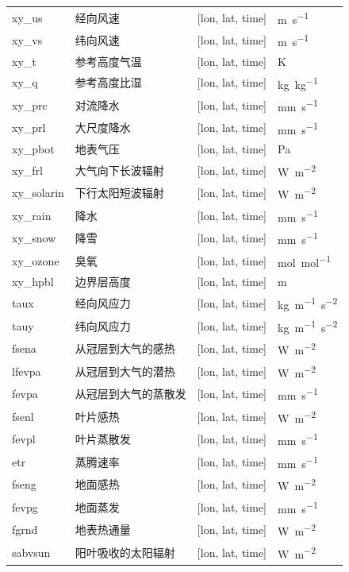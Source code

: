 \documentclass[a4paper,12pt,twoside]{article}
\begin{document}
{\begin{longtable}[htbp]{lp{}p{}l}
xy\_us & 经向风速 & {[}lon, lat, time{]} & \unit{m.s^{-1}} \\
xy\_vs & 纬向风速 & {[}lon, lat, time{]} & \unit{m.s^{-1}} \\
xy\_t & 参考高度气温 & {[}lon, lat, time{]}  & K \\
xy\_q & 参考高度比湿 & {[}lon, lat, time{]}  & \unit{kg.kg^{-1}} \\
xy\_prc & 对流降水 & {[}lon, lat, time{]}  & \unit{mm.s^{-1}} \\
xy\_prl & 大尺度降水 & {[}lon, lat, time{]}  & \unit{mm.s^{-1}} \\
xy\_pbot & 地表气压 & {[}lon, lat, time{]}  & Pa \\
xy\_frl & 大气向下长波辐射 & {[}lon, lat, time{]}  & \unit{W.m^{-2}} \\
xy\_solarin & 下行太阳短波辐射 & {[}lon, lat, time{]}  & \unit{W.m^{-2}} \\
xy\_rain & 降水 & {[}lon, lat, time{]}  & \unit{mm.s^{-1}} \\
xy\_snow & 降雪 & {[}lon, lat, time{]}  & \unit{mm.s^{-1}} \\
xy\_ozone & 臭氧 & {[}lon, lat, time{]}  & \unit{mol.mol^{-1}} \\
xy\_hpbl & 边界层高度 & {[}lon, lat, time{]} & \unit{m} \\
taux & 经向风应力 & {[}lon, lat, time{]}  & \unit{kg.m^{-1}.s^{-2}} \\
tauy & 纬向风应力 & {[}lon, lat, time{]}  & \unit{kg.m^{-1}.s^{-2}} \\
fsena & 从冠层到大气的感热 & {[}lon, lat, time{]}  & \unit{W.m^{-2}} \\
lfevpa & 从冠层到大气的潜热 & {[}lon, lat, time{]}  & \unit{W.m^{-2}} \\
fevpa & 从冠层到大气的蒸散发 & {[}lon, lat, time{]}  & \unit{mm.s^{-1}} \\
fsenl & 叶片感热 & {[}lon, lat, time{]}  & \unit{W.m^{-2}} \\
fevpl & 叶片蒸散发 & {[}lon, lat, time{]}  & \unit{mm.s^{-1}} \\
etr & 蒸腾速率 & {[}lon, lat, time{]}  & \unit{mm.s^{-1}} \\
fseng & 地面感热 & {[}lon, lat, time{]}  & \unit{W.m^{-2}} \\
fevpg & 地面蒸发 & {[}lon, lat, time{]}  & \unit{mm.s^{-1}} \\
fgrnd & 地表热通量 & {[}lon, lat, time{]}  & \unit{W.m^{-2}} \\
sabvsun & 阳叶吸收的太阳辐射 & {[}lon, lat, time{]}  & \unit{W.m^{-2}} \\

\end{longtable}}
\end{document}
